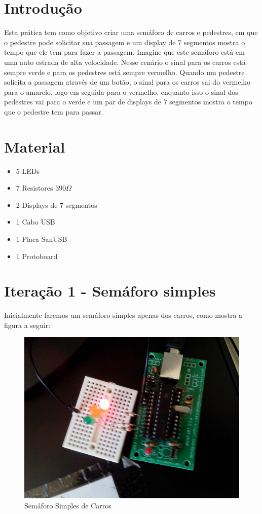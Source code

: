 \section{Introdução}

Esta prática tem como objetivo criar uma semáforo de carros e pedestres,
em que o pedestre pode solicitar sua passagem e um display de 7
segmentos mostra o tempo que ele tem para fazer a passagem. Imagine que
este semáforo está em uma auto estrada de alta velocidade. Nesse cenário
o sinal para os carros está sempre verde e para os pedestres está sempre
vermelho. Quando um pedestre solicita a passagem através de um botão, o
sinal para os carros sai do vermelho para o amarelo, logo em seguida
para o vermelho, enquanto isso o sinal dos pedestres vai para o verde e
um par de displays de 7 segmentos mostra o tempo que o pedestre tem para
passar.

\section{Material}

\begin{itemize}
\item
  5 LEDs
\item
  7 Resistores $390 \Omega$
\item
  2 Displays de 7 segmentos
\item
  1 Cabo USB
\item
  1 Placa SanUSB
\item
  1 Protoboard
\end{itemize}
\section{Iteração 1 - Semáforo simples}

Inicialmente faremos um semáforo simples apenas dos carros, como mostra
a figura a seguir:

\begin{figure}[h]
    \includegraphics[scale=0.15]{img/semaforo-1.jpg}
    \caption{Semáforo Simples de Carros}
\end{figure}

